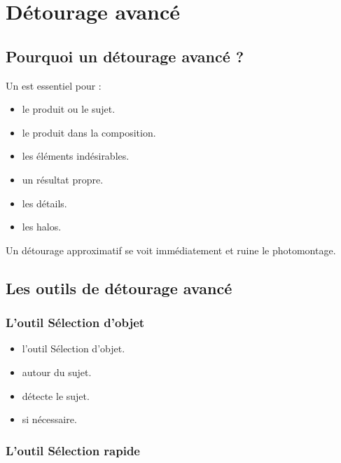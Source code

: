 \section{Détourage avancé}

\subsection{Pourquoi un détourage avancé ?}

Un  est essentiel pour :

\begin{itemize}
    \item {} le produit ou le sujet.
    \item {} le produit dans la composition.
    \item {} les éléments indésirables.
    \item {} un résultat propre.
    \item {} les détails.
    \item {} les halos.
\end{itemize}

Un détourage approximatif se voit immédiatement et ruine le photomontage.

\subsection{Les outils de détourage avancé}

\subsubsection{L'outil Sélection d'objet}

\begin{itemize}
    \item {} l'outil Sélection d'objet.
    \item {} autour du sujet.
    \item {} détecte le sujet.
    \item {} si nécessaire.
\end{itemize}

\subsubsection{L'outil Sélection rapide}

